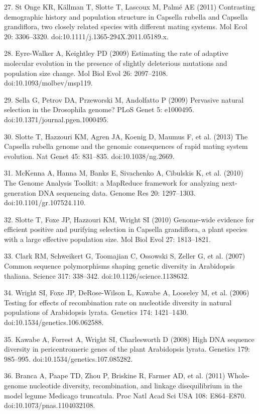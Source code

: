 27.	St Onge KR, Källman T, Slotte T, Lascoux M, Palmé AE (2011) Contrasting demographic history and population structure in Capsella rubella and Capsella grandiflora, two closely related species with different mating systems. Mol Ecol 20: 3306–3320. doi:10.1111/j.1365-294X.2011.05189.x.

28.	Eyre-Walker A, Keightley PD (2009) Estimating the rate of adaptive molecular evolution in the presence of slightly deleterious mutations and population size change. Mol Biol Evol 26: 2097–2108. doi:10.1093/molbev/msp119.

29.	Sella G, Petrov DA, Przeworski M, Andolfatto P (2009) Pervasive natural selection in the Drosophila genome? PLoS Genet 5: e1000495. doi:10.1371/journal.pgen.1000495.

30.	Slotte T, Hazzouri KM, Agren JA, Koenig D, Maumus F, et al. (2013) The Capsella rubella genome and the genomic consequences of rapid mating system evolution. Nat Genet 45: 831–835. doi:10.1038/ng.2669.

31.	McKenna A, Hanna M, Banks E, Sivachenko A, Cibulskis K, et al. (2010) The Genome Analysis Toolkit: a MapReduce framework for analyzing next-generation DNA sequencing data. Genome Res 20: 1297–1303. doi:10.1101/gr.107524.110.

32.	Slotte T, Foxe JP, Hazzouri KM, Wright SI (2010) Genome-wide evidence for efficient positive and purifying selection in Capsella grandiflora, a plant species with a large effective population size. Mol Biol Evol 27: 1813–1821. 

33.	Clark RM, Schweikert G, Toomajian C, Ossowski S, Zeller G, et al. (2007) Common sequence polymorphisms shaping genetic diversity in Arabidopsis thaliana. Science 317: 338–342. doi:10.1126/science.1138632.

34.	Wright SI, Foxe JP, DeRose-Wilson L, Kawabe A, Looseley M, et al. (2006) Testing for effects of recombination rate on nucleotide diversity in natural populations of Arabidopsis lyrata. Genetics 174: 1421–1430. doi:10.1534/genetics.106.062588.

35.	Kawabe A, Forrest A, Wright SI, Charlesworth D (2008) High DNA sequence diversity in pericentromeric genes of the plant Arabidopsis lyrata. Genetics 179: 985–995. doi:10.1534/genetics.107.085282.

36.	Branca A, Paape TD, Zhou P, Briskine R, Farmer AD, et al. (2011) Whole-genome nucleotide diversity, recombination, and linkage disequilibrium in the model legume Medicago truncatula. Proc Natl Acad Sci USA 108: E864–E870. doi:10.1073/pnas.1104032108.

